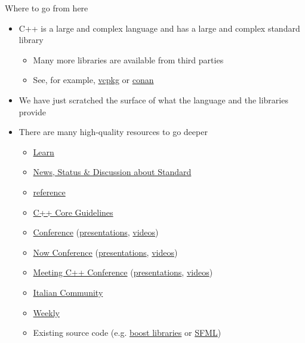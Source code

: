 \begin{frame}{Where to go from here}

  \begin{itemize}
  \item C++ is a large and complex language and has a large and complex standard
    library
    \begin{itemize}
    \item Many more libraries are available from third parties
    \item See, for example, \href{https://vcpkg.io/}{vcpkg} or
      \href{https://conan.io/}{conan}
    \end{itemize}
  \item We have just scratched the surface of what the language and the
    libraries provide
  \item<2-> There are many high-quality resources to go deeper
    \begin{itemize}
    \item \href{https://www.learncpp.com/}{Learn \Cpp{}}
    \item \href{https://isocpp.org/}{News, Status \& Discussion about Standard
        \Cpp{}}
    \item \href{https://cppreference.com/}{\Cpp{} reference}
    \item
      \href{https://isocpp.github.io/CppCoreGuidelines/CppCoreGuidelines}{C++
        Core Guidelines}
    \item \href{https://cppcon.org/}{\Cpp{} Conference} (\href{https://github.com/cppcon}{presentations},
      \href{https://youtube.com/cppcon}{videos})
    \item \href{https://cppnow.org/}{\Cpp{} Now Conference} (\href{https://github.com/boostcon}{presentations},
      \href{https://youtube.com/boostcon}{videos})
    \item \href{https://meetingcpp.com/}{Meeting C++ Conference}
      (\href{https://meetingcpp.com/mcpp/slides/}{presentations},
      \href{https://www.youtube.com/c/MeetingCPP}{videos})
    \item \href{https://italiancpp.org/}{Italian \Cpp{} Community}
    \item \href{https://www.youtube.com/@cppweekly}{\Cpp{} Weekly}
    \item Existing source code (e.g. \href{https://www.boost.org/}{boost
        libraries} or \href{https://www.sfml-dev.org/}{SFML})
    \end{itemize}
  \end{itemize}
\end{frame}
